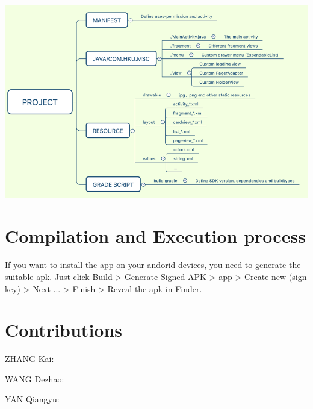 \documentclass{article}
\begin{document}
    \begin{center}
        \includegraphics[width=5.5in]{structure}
    \end{center}

    \section{Compilation and Execution process}

    If you want to install the app on your andorid devices, 
    you need to generate the suitable apk. 
    Just click Build > Generate Signed APK > app > 
    Create new (sign key) > Next ... > Finish > Reveal the apk in Finder.

    \section{Contributions}
    
    ZHANG Kai: 

    WANG Dezhao:

    YAN Qiangyu:

    
\end{document}
